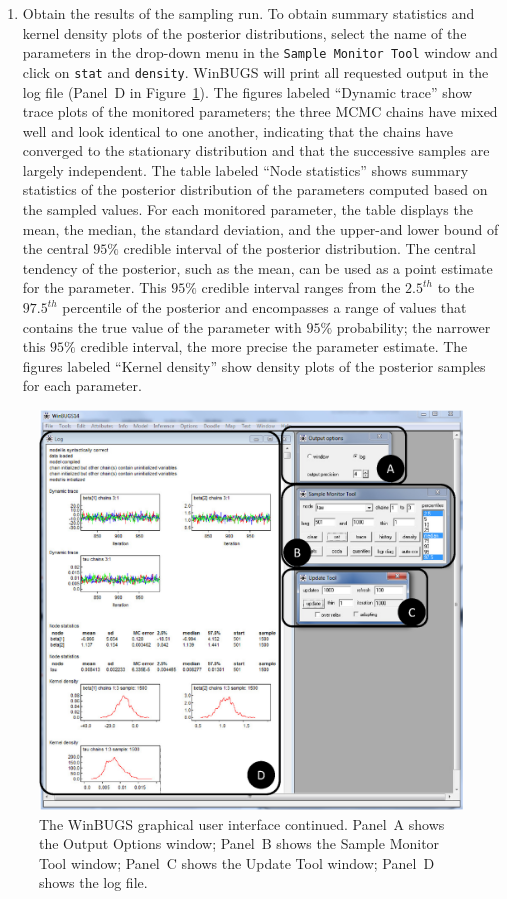 \begin{enumerate}
\item Obtain the results of the sampling run. To obtain summary statistics and kernel density plots of the posterior distributions, select the name of the parameters in the drop-down menu in the \texttt{Sample Monitor Tool} window and click on \texttt{stat} and \texttt{density}. WinBUGS will print all requested output in the log file (Panel~D in Figure~\ref{fig:bi3:GUI2}). {The figures labeled ``Dynamic trace'' show trace plots of the monitored parameters; the three MCMC chains have mixed well and look identical to one another, indicating that the chains have converged to the stationary distribution and that the successive samples are largely independent. The table labeled ``Node statistics'' shows summary statistics of the posterior distribution of the parameters computed based on the sampled values. For each monitored parameter, the table displays the mean, the median, the standard deviation, and the upper-and lower bound of the central $95\%$ credible interval of the posterior distribution. The central tendency of the posterior, such as the mean, can be used as a point estimate for the parameter. This $95\%$ credible interval ranges from the $2.5^{th}$ to the $97.5^{th}$ percentile of the posterior and encompasses a range of values that contains the true value of the parameter with $95\%$ probability; the narrower this $95\%$ credible interval, the more precise the parameter estimate. The figures labeled ``Kernel density'' show density plots of the posterior samples for each parameter.}

\end{enumerate}

\begin{figure}[!tp]
\includegraphics[width=1\textwidth]{figs/bi3_WinBUGS_GUI2}
\caption{{The WinBUGS graphical user interface continued.} Panel~A shows the Output Options window; Panel~B shows the Sample Monitor Tool window; Panel~C shows the Update Tool window; Panel~D shows the log file.}\label{fig:bi3:GUI2}
\end{figure} 

